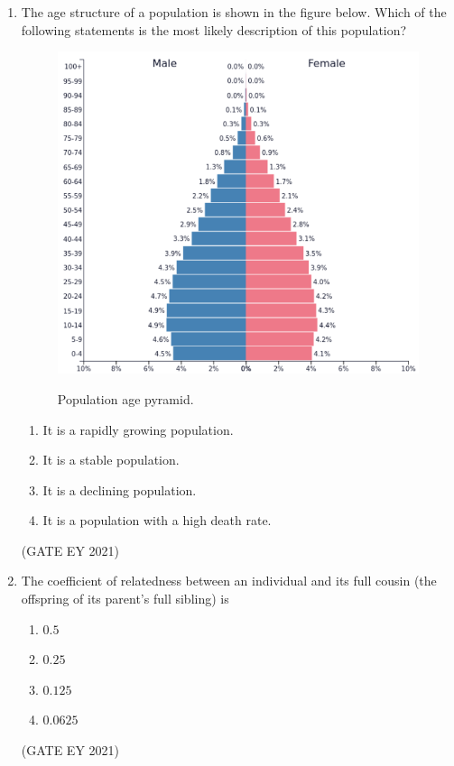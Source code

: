 \documentclass[journal]{IEEEtran}
\begin{document}
\begin{enumerate}
    \item The age structure of a population is shown in the figure below. Which of the following statements is the most likely description of this population?
    \begin{figure}[!h]
        \centering
        \includegraphics[width=0.4\columnwidth]{figs/Q.42.png}
        \label{Q.42}
        \caption{Population age pyramid.}
    \end{figure}
    \begin{enumerate}
        \item It is a rapidly growing population.
        \item It is a stable population.
        \item It is a declining population.
        \item It is a population with a high death rate.
    \end{enumerate}
    \hfill{(GATE EY 2021)}
    
    \item The coefficient of relatedness between an individual and its full cousin (the offspring of its parent's full sibling) is
    \begin{multicols}{2}
    \begin{enumerate}
        \item $0.5$
        \item $0.25$
        \item $0.125$
        \item $0.0625$
    \end{enumerate}
    \end{multicols}
    \hfill{(GATE EY 2021)}


\end{enumerate}
\end{document}
